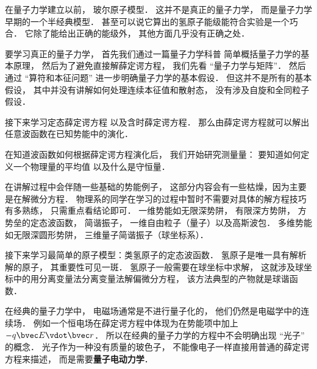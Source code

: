 在量子力学建立以前， 玻尔原子模型． 这并不是真正的量子力学， 而是量子力学早期的一个半经典模型． 甚至可以说它算出的氢原子能级能符合实验是一个巧合． 它除了能给出正确的能级外， 其他方面几乎没有正确之处．

要学习真正的量子力学， 首先我们通过一篇量子力学科普 简单概括量子力学的基本原理， 然后为了避免直接解薛定谔方程， 我们先看 “量子力学与矩阵”． 然后通过 “算符和本征问题” 进一步明确量子力学的基本假设． 但这并不是所有的基本假设， 其中并没有讲解如何处理连续本征值和散射态， 没有涉及自旋和全同粒子假设．

接下来学习定态薛定谔方程 以及含时薛定谔方程． 那么由薛定谔方程就可以解出任意波函数在已知势能中的演化．

在知道波函数如何根据薛定谔方程演化后， 我们开始研究测量量： 要知道如何定义一个物理量的平均值 以及什么是守恒量．

在讲解过程中会伴随一些基础的势能例子， 这部分内容会有一些枯燥，因为主要是在解微分方程． 物理系的同学在学习的过程中暂时不需要对具体的解方程技巧有多熟练， 只需重点看结论即可． 一维势能如无限深势阱， 有限深方势阱， 方势垒的定态波函数， 简谐振子， 一维自由粒子（量子）以及高斯波包． 多维势能如无限深圆形势阱， 三维量子简谐振子（球坐标系）．

接下来学习最简单的原子模型：类氢原子的定态波函数． 氢原子是唯一具有解析解的原子， 其重要性可见一斑． 氢原子一般需要在球坐标中求解， 这就涉及球坐标中的用分离变量法分离变量法解偏微分方程， 该方法典型的产物就是球谐函数．

在经典的量子力学中， 电磁场通常是不进行量子化的， 他们仍然是电磁学中的连续场． 例如一个恒电场在薛定谔方程中体现为在势能项中加上 $-q\bvec E \vdot \bvec r$． 所以在经典的量子力学的方程中不会明确出现 “光子” 的概念． 光子作为一种没有质量的玻色子， 不能像电子一样直接用普通的薛定谔方程来描述， 而是需要\textbf{量子电动力学}．
